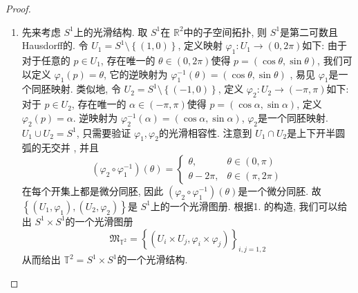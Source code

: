 \documentclass[../main.tex]{subfiles}
\begin{document}
\begin{proof}
\begin{enumerate}
        因此 \(  \left\{  \varphi _{\alpha }\times \psi _{\beta }, U_{\alpha }\times X_{\beta }, V_{\alpha }\times Y_{\beta } \right\}  \)构成 \(  M\times N  \) 上的一个光滑图册. 故而 \(  M\times N  \)是一个光滑流形.    
        \item 先来考虑 \(  S^{1}  \)上的光滑结构. 取 \(  S^{1}  \)在 \(  \mathbb{R} ^{2}  \)中的子空间拓扑, 则 \(  S^{1}  \)是第二可数且Hausdorff的. 令 \(  U_1= S^{1}\setminus \left\{ \left( 1,0 \right)  \right\}  \), 定义映射 \(   \varphi _1 :U_1\to \left( 0,2 \pi \right)   \)如下:  由于对于任意的 \(  p \in U_1  \),  存在唯一的 \(   \theta  \in \left( 0,2 \pi \right)   \)使得        \(  p= \left( \cos  \theta ,\sin  \theta  \right)   \), 我们可以定义 \(   \varphi _1 \left( p \right)=  \theta    \), 它的逆映射为 \(   \varphi _1 ^{-1} \left(  \theta  \right)= \left( \cos  \theta , \sin  \theta  \right)    \)  , 易见 \(   \varphi _1   \)是一个同胚映射.  类似地, 令 \(  U_2= S^{1}\setminus \left\{ \left( -1,0 \right)  \right\}  \), 定义 \(   \varphi _2 :U_2\to \left( - \pi, \pi \right)   \)如下: 对于 \(  p\in U_2  \), 存在唯一的 \(  \alpha \in \left( - \pi, \pi \right)   \)使得 \(  p= \left( \cos \alpha ,\sin \alpha  \right)   \), 定义 \(   \varphi _2 \left( p \right)= \alpha    \). 逆映射为 \(   \varphi _2 ^{-1} \left( \alpha  \right)= \left( \cos \alpha ,\sin \alpha  \right)    \), \(   \varphi _2   \)是一个同胚映射.  \(  U_1\cup U_2= S^{1}  \), 只需要验证 \(   \varphi _1 , \varphi _2   \)的光滑相容性.  注意到 \(  U_1\cap U_2  \)是上下开半圆弧的无交并 , 并且 \[
        \left(  \varphi _2 \circ  \varphi _1 ^{-1}  \right)\left(  \theta  \right)= \begin{cases}  \theta ,&  \theta \in \left( 0, \pi \right)\\ 
          \theta -2 \pi,&  \theta \in \left(  \pi,2 \pi \right)  \end{cases}   
        \]       在每个开集上都是微分同胚, 因此 \(  \left(  \varphi _2 \circ  \varphi _1 ^{-1}  \right)\left(  \theta  \right)    \)是一个微分同胚.     故 \(  \left\{ \left( U_1, \varphi _1  \right),\left( U_2, \varphi _2  \right)   \right\}  \)是 \(  S^{1}  \)上的一个光滑图册. 根据1. 的构造, 我们可以给出 \(  S^{1}\times S^{1}  \)的一个光滑图册 \[
       \mathfrak{M}_{\mathbb{T}^{2}}=  \left\{ \left( U_{i}\times U_{j}, \varphi _{i}\times  \varphi _{j} \right)  \right\}_{i,j= 1,2}
        \]从而给出 \(  \mathbb{T}^{2}= S^{1}\times S^{1}  \)的一个光滑结构. 
    \end{enumerate}
    
\end{proof}
\end{document}
